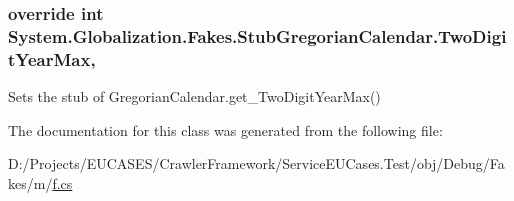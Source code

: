 \hypertarget{class_system_1_1_globalization_1_1_fakes_1_1_stub_gregorian_calendar_a8ea6155fe1afc7af1d26e372d51da0b7}{
\subsubsection[{Two\-Digit\-Year\-Max}]{\setlength{\rightskip}{0pt plus 5cm}override int System.\-Globalization.\-Fakes.\-Stub\-Gregorian\-Calendar.\-Two\-Digit\-Year\-Max\hspace{0.3cm}{\ttfamily [get]}, {\ttfamily [set]}}}\label{class_system_1_1_globalization_1_1_fakes_1_1_stub_gregorian_calendar_a8ea6155fe1afc7af1d26e372d51da0b7}


Sets the stub of Gregorian\-Calendar.\-get\-\_\-\-Two\-Digit\-Year\-Max()



The documentation for this class was generated from the following file\-:\begin{DoxyCompactItemize}
\item 
D\-:/\-Projects/\-E\-U\-C\-A\-S\-E\-S/\-Crawler\-Framework/\-Service\-E\-U\-Cases.\-Test/obj/\-Debug/\-Fakes/m/\hyperlink{m_2f_8cs}{f.\-cs}\end{DoxyCompactItemize}
